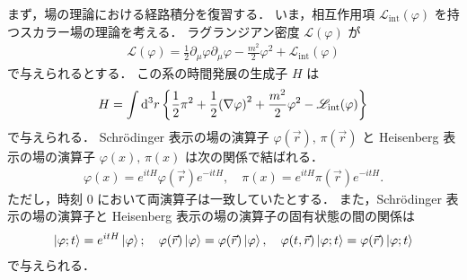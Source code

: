 \documentclass[dvipdfmx, a4paper]{jarticle}
\numberwithin{equation}{section}
\begin{document}
まず，場の理論における経路積分を復習する．
いま，相互作用項 $\mathscr{L}_\mathrm{int}(\varphi)$ を持つスカラー場の理論を考える．
ラグランジアン密度 $\mathscr{L}(\varphi)$ が
\begin{align}
  \mathscr{L}(\varphi) = \frac{1}{2} \partial_\mu \varphi \partial_\mu \varphi - \frac{m^2}{2} \varphi^2 + \mathscr{L}_\mathrm{int}(\varphi)
\end{align}
で与えられるとする．
この系の時間発展の生成子 $H$ は
\begin{align}
  H = \int \dd^3r \, \qty{\frac{1}{2}\pi^2 + \frac{1}{2}\qty(\nabla \varphi)^2 + \frac{m^2}{2}\varphi^2 - \mathscr{L}_\mathrm{int}(\varphi)}
\end{align}
で与えられる．
Schrödinger 表示の場の演算子 $\varphi(\vec{r}),\, \pi(\vec{r})$ と Heisenberg 表示の場の演算子 $\varphi(x),\, \pi(x)$ は次の関係で結ばれる．
\begin{align}
  \varphi(x) = e^{it H} \varphi(\vec{r})e^{-it H}, \quad \pi(x) = e^{it H} \pi(\vec{r}) e^{-it H}.
\end{align}
ただし，時刻 0 において両演算子は一致していたとする．
また，Schrödinger 表示の場の演算子と Heisenberg 表示の場の演算子の固有状態の間の関係は
\begin{align}
  \ket{\varphi; t} = e^{it H} \ket{\varphi}; \quad \varphi(\vec{r}) \ket{\varphi} = \varphi(\vec{r}) \ket{\varphi}, \quad
  \varphi(t, \vec{r}) \ket{\varphi; t} = \varphi(\vec{r}) \ket{\varphi; t}
\end{align}
で与えられる．
\end{document}
